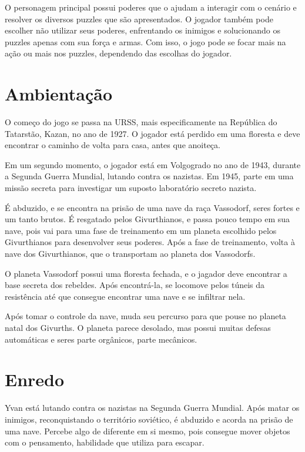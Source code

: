 \documentclass[12pt, a4paper]{article}
\begin{document}
    O personagem principal possui poderes que o ajudam
    a interagir com o cenário e resolver os diversos puzzles que são apresentados.
    O jogador também pode escolher não utilizar seus poderes, enfrentando os inimigos
    e solucionando os puzzles apenas com sua força e armas. Com isso, o jogo pode se
    focar mais na ação ou mais nos puzzles, dependendo das escolhas do jogador.

\section{Ambientação}
    O começo do jogo se passa na URSS, mais especificamente na República do Tatarstão, Kazan,
    no ano de 1927. O jogador está perdido em uma floresta e deve encontrar o caminho
    de volta para casa, antes que anoiteça.

    Em um segundo momento, o jogador está em Volgogrado no ano de 1943, durante a Segunda
    Guerra Mundial, lutando contra os nazistas. Em 1945, parte em uma missão secreta
    para investigar um suposto laboratório secreto nazista.

    É abduzido, e se encontra na prisão de uma nave da raça Vassodorf, seres fortes e
    um tanto brutos. É resgatado pelos Givurthianos, e passa pouco tempo em sua nave, 
    pois vai para uma fase de treinamento em um planeta escolhido pelos Givurthianos
    para desenvolver seus poderes. Após a fase de treinamento, volta à nave dos 
    Givurthianos, que o transportam ao planeta dos Vassodorfs.

    O planeta Vassodorf possui uma floresta fechada, e o jagador deve encontrar a
    base secreta dos rebeldes. Após encontrá-la, se locomove pelos túneis da resistência
    até que consegue encontrar uma nave e se infiltrar nela.

    Após tomar o controle da nave, muda seu percurso para que pouse no planeta natal
    dos Givurths. O planeta parece desolado, mas possui muitas defesas automáticas
    e seres parte orgânicos, parte mecânicos.

\section{Enredo}
    Yvan está lutando contra os nazistas na Segunda Guerra Mundial. Após matar
    os inimigos, reconquistando o território soviético, é abduzido e acorda
    na prisão de uma nave. Percebe algo de diferente em si mesmo, pois consegue
    mover objetos com o pensamento, habilidade que utiliza para escapar.
\end{document}
